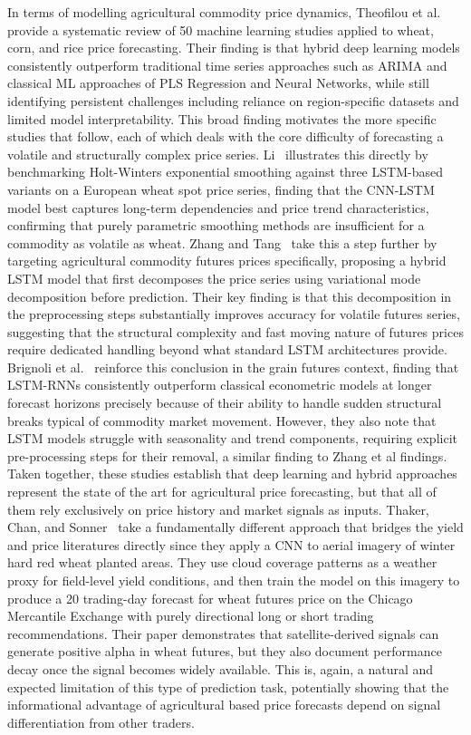 \documentclass[pdflatex,sn-mathphys-num, oneside]{sn-jnl}%
\theoremstyle{thmstyleone}%
\theoremstyle{thmstyletwo}%
\theoremstyle{thmstylethree}%
\begin{document}
In terms of modelling agricultural commodity price dynamics, Theofilou et al.~\cite{bib21} provide a systematic review of 50 machine learning studies applied to wheat, corn, and rice price forecasting. Their finding is that hybrid deep learning models consistently outperform traditional time series approaches such as ARIMA and classical ML approaches of PLS Regression and Neural Networks, while still identifying persistent challenges including reliance on region-specific datasets and limited model interpretability. This broad finding motivates the more specific studies that follow, each of which deals  with the core difficulty of forecasting a volatile and structurally complex price series. Li~\cite{bib18} illustrates this directly by benchmarking Holt-Winters exponential smoothing against three LSTM-based variants on a European wheat spot price series, finding that the CNN-LSTM model best captures long-term dependencies and price trend characteristics, confirming that purely parametric smoothing methods are insufficient for a commodity as volatile as wheat. Zhang and Tang~\cite{bib22} take this a step further by targeting agricultural commodity futures prices specifically, proposing a hybrid LSTM model that first decomposes the price series using variational mode decomposition before prediction. Their key finding is that this decomposition in the preprocessing steps substantially improves accuracy for volatile futures series, suggesting that the structural complexity and fast moving nature of futures prices require dedicated handling beyond what standard LSTM architectures provide. Brignoli et al.~\cite{bib23} reinforce this conclusion in the grain futures context, finding that LSTM-RNNs consistently outperform classical econometric models at longer forecast horizons precisely because of their ability to handle sudden structural breaks typical of commodity market movement. However, they also note that LSTM models struggle with seasonality and trend components, requiring explicit pre-processing steps for their removal, a similar finding to Zhang et al\cite{bib22} findings. Taken together, these studies establish that deep learning and hybrid approaches represent the state of the art for agricultural price forecasting, but that all of them rely exclusively on price history and market signals as inputs. Thaker, Chan, and Sonner~\cite{bib19} take a fundamentally different approach that bridges the yield and price literatures directly since they apply a CNN to aerial imagery of winter hard red wheat planted areas. They use cloud coverage patterns as a weather proxy for field-level yield conditions, and then train the model on this imagery to produce a 20 trading-day forecast for wheat futures price on the Chicago Mercantile Exchange with purely directional long or short trading recommendations. Their paper demonstrates that satellite-derived signals can generate positive alpha in wheat futures, but they also document performance decay once the signal becomes widely available. This is, again, a natural and expected limitation of this type of prediction task, potentially showing that the informational advantage of agricultural based price forecasts depend on signal differentiation from other traders.
\end{document}
